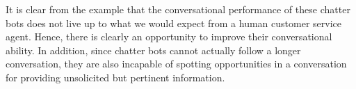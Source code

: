 It is clear from the example that the conversational performance of these chatter bots does not live up to what we would expect from a human customer service agent. Hence, there is clearly an opportunity to improve their conversational ability. In addition, since chatter bots cannot actually follow a longer conversation, they are also incapable of spotting opportunities in a conversation for providing unsolicited but pertinent information.


